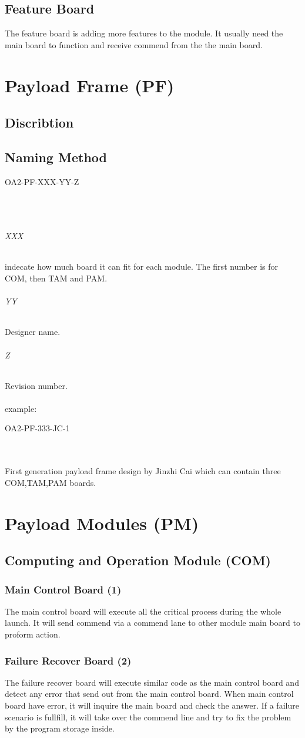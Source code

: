 \documentclass[12pt,article]{memoir}
\begin{document}
\section{Feature Board}%
The feature board is adding more features to the module. It usually need the main board to function and receive commend from the the main board.
\newpage
\chapter{Payload Frame (PF)}
\section{Discribtion}
\section{Naming Method}
\begin{LARGE}
OA2-PF-XXX-YY-Z
\end{LARGE}\\\\
\subparagraph{XXX}
indecate how much board it can fit for each module. The first number is for COM, then TAM and PAM.
\subparagraph{YY}
Designer name.
\subparagraph{Z}
Revision number.
\\\\
example: 
\begin{large}
OA2-PF-333-JC-1
\end{large}\\\\
First generation payload frame design by Jinzhi Cai which can contain three COM,TAM,PAM boards.
\newpage
\chapter{Payload Modules (PM)}
\section{Computing and Operation Module (COM)}
\subsection{Main Control Board (1)}
The main control board will execute all the critical process during the whole launch. It will send commend via a commend lane to other module main board to proform action.
\subsection{Failure Recover Board (2)}
The failure recover board will execute similar code as the main control board and detect any error that send out from the main control board. When main control board have error, it will inquire the main board and check the answer. If a failure scenario is fullfill, it will take over the commend line and try to fix the problem by the program storage inside.
\end{document}
